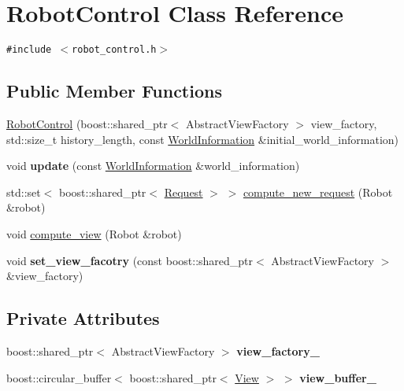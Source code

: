 \hypertarget{class_robot_control}{
\section{RobotControl Class Reference}
\label{class_robot_control}
}
{\tt \#include $<$robot\_\-control.h$>$}

\subsection*{Public Member Functions}
\begin{CompactItemize}
\item 
\hyperlink{class_robot_control_2f44ebe0a98fff131117c10b3594381f}{RobotControl} (boost::shared\_\-ptr$<$ AbstractViewFactory $>$ view\_\-factory, std::size\_\-t history\_\-length, const \hyperlink{class_world_information}{WorldInformation} \&initial\_\-world\_\-information)
\item 
\hypertarget{class_robot_control_1d0bc5562cbfed424f029c09a38971ee}{
void \textbf{update} (const \hyperlink{class_world_information}{WorldInformation} \&world\_\-information)}
\label{class_robot_control_1d0bc5562cbfed424f029c09a38971ee}

\item 
std::set$<$ boost::shared\_\-ptr$<$ \hyperlink{class_request}{Request} $>$ $>$ \hyperlink{class_robot_control_55c97895d6d2a895ce67ecd118e7f1a0}{compute\_\-new\_\-request} (Robot \&robot)
\item 
void \hyperlink{class_robot_control_368f64b670eb9b3dd9488616832cafa9}{compute\_\-view} (Robot \&robot)
\item 
\hypertarget{class_robot_control_bca9b0186a6380e8838e47023a2626f9}{
void \textbf{set\_\-view\_\-facotry} (const boost::shared\_\-ptr$<$ AbstractViewFactory $>$ \&view\_\-factory)}
\label{class_robot_control_bca9b0186a6380e8838e47023a2626f9}

\end{CompactItemize}
\subsection*{Private Attributes}
\begin{CompactItemize}
\item 
\hypertarget{class_robot_control_928c58a2249ec85a6bbb742990db7551}{
boost::shared\_\-ptr$<$ AbstractViewFactory $>$ \textbf{view\_\-factory\_\-}}
\label{class_robot_control_928c58a2249ec85a6bbb742990db7551}

\item 
\hypertarget{class_robot_control_a6a8906b228423d0815d04a849e2e489}{
boost::circular\_\-buffer$<$ boost::shared\_\-ptr$<$ \hyperlink{class_view}{View} $>$ $>$ \textbf{view\_\-buffer\_\-}}
\label{class_robot_control_a6a8906b228423d0815d04a849e2e489}

\end{CompactItemize}


